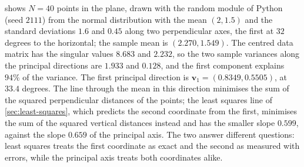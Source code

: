  shows $N=40$ points in the plane, drawn with the random module of Python (seed $2111$) from the normal distribution with the mean $(2,1.5)$ and the standard deviations $1.6$ and $0.45$ along two perpendicular axes, the first at $32$ degrees to the horizontal; the sample mean is $(2.270,1.549)$. The centred data matrix has the singular values $8.683$ and $2.232$, so the two sample variances along the principal directions are $1.933$ and $0.128$, and the first component explains $94\%$ of the variance. The first principal direction is $\mathbf v_1=(0.8349,0.5505)$, at $33.4$ degrees. The line through the mean in this direction minimises the sum of the squared perpendicular distances of the points; the least squares line of \cref{sec:least-squares}, which predicts the second coordinate from the first, minimises the sum of the squared vertical distances instead and has the smaller slope $0.599$, against the slope $0.659$ of the principal axis. The two answer different questions: least squares treats the first coordinate as exact and the second as measured with errors, while the principal axis treats both coordinates alike.

